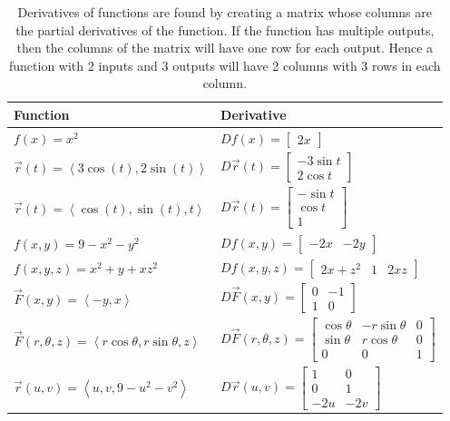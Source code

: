 \begin{table}[htb]
\begin{center}
\begin{tabular}{|l|l|}
\hline
Function&Derivative\\ \hline
{$f(x)=x^2$}& {$Df(x) = \begin{bmatrix}2x\end{bmatrix} $}\\ \hline
{$\vec r(t) = \left<3\cos(t),2\sin(t)\right>$}&  {$D\vec r(t) = \begin{bmatrix}-3\sin t\\ 2\cos t\end{bmatrix} $}\\ \hline
{$\vec r(t) = \left<\cos(t),\sin(t),t\right>$}&  {$D\vec r(t) = \begin{bmatrix}-\sin t \\ \cos t \\ 1\end{bmatrix} $}\\ \hline
{$f(x,y)=9-x^2-y^2$}&  {$Df(x,y) = \begin{bmatrix}-2x & -2y\end{bmatrix} $}\\ \hline
{$f(x,y,z)=x^2+y+xz^2$}&  {$Df(x,y,z) = \begin{bmatrix}2x+z^2 & 1 &2xz\end{bmatrix} $}\\ \hline
{$\vec F(x,y)=\left<-y,x\right>$}&  {$D\vec F(x,y) = \begin{bmatrix}0&-1\\ 1&0\end{bmatrix} $}\\ \hline
{$\vec F(r,\theta,z)=\left<r\cos\theta,r\sin\theta,z\right>$}&  {$D\vec F(r,\theta,z) = 
\begin{bmatrix}
\cos \theta &-r\sin\theta&0\\ 
\sin\theta&r\cos\theta&0\\ 
0&0&1
\end{bmatrix} $}\\ \hline
{$\vec r (u,v)=\left<u,v,9-u^2-v^2\right>$}&  {$D\vec r(u,v) = \begin{bmatrix}1&0\\ 0&1\\ -2u&-2v\end{bmatrix} $}\\ \hline
\end{tabular}
\end{center}
\caption{\label{dertable} Derivatives of functions are found by creating a matrix whose columns are the partial derivatives of the function.  If the function has multiple outputs, then the columns of the matrix will have one row for each output.  Hence a function with 2 inputs and 3 outputs will have 2 columns with 3 rows in each column.}
\end{table}

